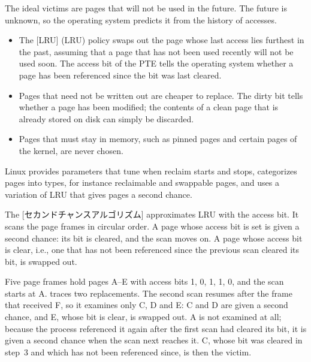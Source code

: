 \documentclass[../main.tex]{subfiles}
\begin{document}
The ideal victims are pages that will not be used in the future.  The
future is unknown, so the operating system predicts it from the history of
accesses.
\begin{itemize}
  \item The [LRU]
    (LRU) policy swaps out the page whose last access lies furthest in the
    past, assuming that a page that has not been used recently will not be
    used soon.  The access bit of the PTE tells the operating system
    whether a page has been referenced since the bit was last cleared.
  \item Pages that need not be written out are cheaper to replace.  The
    dirty bit tells whether a page has been modified; the contents of a
    clean page that is already stored on disk can simply be discarded.
  \item Pages that must stay in memory, such as pinned pages and certain
    pages of the kernel, are never chosen.
\end{itemize}
Linux provides parameters that tune when reclaim starts and
stops, categorizes
pages into types, for instance reclaimable and swappable pages, and uses a
variation of LRU that gives pages a second chance.

\begin{definition}
  The [セカンドチャンスアルゴリズム]
  approximates LRU with the access bit.  It scans the page frames in
  circular order.  A page whose access bit is set is given a second chance:
  its bit is cleared, and the scan moves on.  A page whose access bit is
  clear, i.e., one that has not been referenced since the previous scan
  cleared its bit, is swapped out.
\end{definition}

\begin{example}
  \label{ex:l08-second-chance}
  Five page frames hold pages A--E with access bits 1, 0, 1, 1, 0, and the
  scan starts at A.   traces two replacements.
  The second scan resumes after the frame that received F, so it examines
  only C, D and E: C and D are given a second chance, and E, whose bit is
  clear, is swapped out.  A is not examined at all; because the process
  referenced it again after the first scan had cleared its bit, it is given
  a second chance when the scan next reaches it.  C, whose bit was cleared
  in step~3 and which has not been referenced since, is then the victim.
\end{example}
\end{document}
